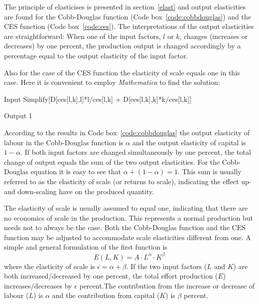 \documentclass[11pt,fleqn]{book} %
\begin{document}
The principle of elasticises is presented in section~\ref{elast} and output elasticities are found for the Cobb-Douglas function (Code box~\ref{code:cobbdouglas}) and the CES function (Code box~\ref{code:ces}). The interpretations of the output elasticities are straightforward: When one of the input factors, $l$ or $k$, changes (increases or decreases) by one percent, the production output is changed accordingly by a percentage equal to the output elasticity of the input factor.

\begin{theorem}
\hfill \break
Also for the case of the CES function the elasticity of scale equals one in this case. Here it is convenient to employ \textit{Mathematica} to find the solution:
\begin{mmaCell}[index=7,morepattern={l,k,l_,k_}]{Input}
  Simplify[D[ces[l,k],l]*l/ces[l,k] + D[ces[l,k],k]*k/ces[l,k]]
\end{mmaCell}
\begin{mmaCell}{Output}
  1
\end{mmaCell}
\end{theorem}

According to the results in Code box~\ref{code:cobbdouglas} the output elasticity of labour in the Cobb-Douglas function is $\alpha$ and the output elasticity of capital is $1 - \alpha$. If both input factors are changed simultaneously by one percent, the total change of output equals the sum of the two output elasticities. For the Cobb-Douglas equation it is easy to see that $\alpha + (1 - \alpha) = 1$. This sum is usually referred to as the elasticity of scale (or returns to scale), indicating the effect up- and down-scaling have on the produced quantity. 

The elasticity of scale is usually assumed to equal one, indicating that there are no economics of scale in the production. This represents a normal production but needs not to always be the case. Both the Cobb-Douglas function and the CES function may be adjusted to accommodate scale elasticities different from one. A simple and general formulation of the first function is
\begin{equation} 
\label{eq:cobbdouglas2}
E(L,K) = A \cdot L^{\alpha} \cdot K^{\beta}
\end{equation}
where the elasticity of scale is $\epsilon = \alpha + \beta$. If the two input factors ($L$ and $K$) are both increased/decreased by one percent, the total effort production ($E$) increases/decreases by $\epsilon$ percent.The contribution from the increase or decrease of labour ($L$) is $\alpha$ and the contribution from capital ($K$) is $\beta$ percent.
\end{document}
